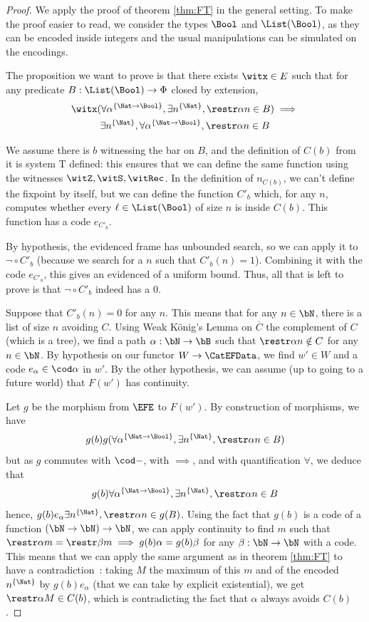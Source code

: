 \begin{proof}
  We apply the proof of theorem \ref{thm:FT} in the general setting. To make the proof easier to read, we consider the types $\Bool$ and $\List(\Bool)$, as they can be encoded inside integers and the usual manipulations can be simulated on the encodings.

  The proposition we want to prove is that there exists $\witx \in E$ such that for any predicate $B : \List(\Bool) \to \Phi$ closed by extension,
  \begin{multline*}
    \witx\real (\forall \alpha^{\{\Nat \to \Bool\}}, \exists n^{\{\Nat\}}, \restr \alpha n \in B) \implies\\
    \exists n^{\{\Nat\}}, \forall \alpha^{\{\Nat \to \Bool\}}, \restr \alpha n \in B
  \end{multline*}
  
  We assume there is $b$ witnessing the bar on $B$, and the definition of $C(b)$ from it is system T defined: this ensures that we can define the same function using the witnesses $\witZ,\witS,\witRec$. In the definition of $n_{C(b)}$, we can't define the fixpoint by itself, but we can define the function $C'_b$ which, for any $n$, computes whether every $\ell \in \List(\Bool)$ of size $n$ is inside $C(b)$. This function has a code $e_{C'_b}$.

  By hypothesis, the evidenced frame has unbounded search, so we can apply it to $\lnot \circ C'_b$ (because we search for a $n$ such that $C'_b(n) = 1$). Combining it with the code $e_{C'_b}$, this gives an evidenced of a uniform bound. Thus, all that is left to prove is that $\lnot \circ C'_b$ indeed has a $0$.

  Suppose that $C'_b(n) = 0$ for any $n$. This means that for any $n \in \bN$, there is a list of size $n$ avoiding $C$. Using Weak König's Lemma on $\overline{C}$ the complement of $C$ (which is a tree), we find a path $\alpha : \bN \to \bB$ such that $\restr \alpha n \notin C$ for any $n \in \bN$. By hypothesis on our functor $W \to \CatEFData$, we find $w' \in W$ and a code $e_\alpha \in \cod \alpha$ in $w'$. By the other hypothesis, we can assume (up to going to a future world) that $F(w')$ has continuity.

  Let $g$ be the morphism from $\EFE$ to $F(w')$. By construction of morphisms, we have
  \[g(b)\real g(\forall \alpha^{\{\Nat \to \Bool\}}, \exists n^{\{\Nat\}}, \restr \alpha n \in B)\]
  but as $g$ commutes with $\cod -$, with $\implies$, and with quantification $\forall$, we deduce that
  \[g(b)\real \forall \alpha^{\{\Nat \to \Bool\}}, \exists n^{\{\Nat\}}, \restr \alpha n \in B\]
  hence, $g(b) e_{\alpha} \real \exists n^{\{\Nat\}}, \restr \alpha n \in g(B)$. Using the fact that $g(b)$ is a code of a function $(\bN \to \bN) \to \bN$, we can apply continuity to find $m$ such that $\restr \alpha m = \restr \beta m \implies g(b) \alpha = g(b) \beta$ for any $\beta : \bN \to \bN$ with a code. This means that we can apply the same argument as in theorem \ref{thm:FT} to have a contradiction~: taking $M$ the maximum of this $m$ and of the encoded $n^{\{\Nat\}}$ by $g(b) e_{\alpha}$ (that we can take by explicit existential), we get $\restr \alpha M \in C(b)$, which is contradicting the fact that $\alpha$ always avoids $C(b)$.
\end{proof}

